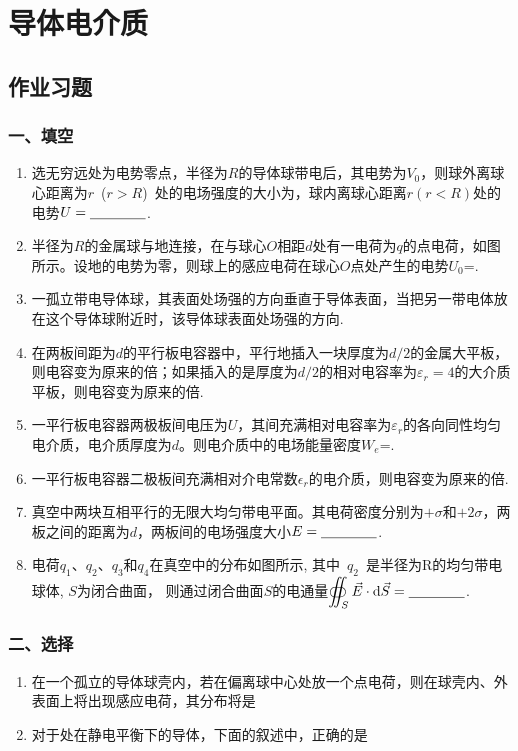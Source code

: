\chapter{导体电介质}
\section{作业习题}
\subsection*{一、填空}
\begin{enumerate}
    \item 选无穷远处为电势零点，半径为$R$的导体球带电后，其电势为$V_0$，则球外离球心距离为$r$~($r>R$)~处的电场强度的大小为\nl，球内离球心距离$r(r<R)$处的电势$U=\nl$.
    \item 半径为$R$的金属球与地连接，在与球心$O$相距$d$处有一电荷为$q$的点电荷，如图所示。设地的电势为零，则球上的感应电荷在球心$O$点处产生的电势$U_0$=\nl.    
    \item 一孤立带电导体球，其表面处场强的方向垂直于导体表面，当把另一带电体放在这个导体球附近时，该导体球表面处场强的方向\nl.
    \item 在两板间距为$d$的平行板电容器中，平行地插入一块厚度为$d/2$的金属大平板，则电容变为原来的\nl 倍；如果插入的是厚度为$d/2$的相对电容率为$\varepsilon_r = 4$的大介质平板，则电容变为原来的\nl 倍.
    \item 一平行板电容器两极板间电压为$U$，其间充满相对电容率为$\varepsilon_r$的各向同性均匀电介质，电介质厚度为$d$。则电介质中的电场能量密度$W_e$=\nl.
    \item 一平行板电容器二极板间充满相对介电常数$\epsilon_r$的电介质，则电容变为原来的\underline{\makebox[3em]{}}倍.
    \item 真空中两块互相平行的无限大均匀带电平面。其电荷密度分别为$+\sigma$和$+2\sigma$，两板之间的距离为$d$，两板间的电场强度大小$E=\nl$.
    \item 电荷$q_1$、$q_2$、$q_3$和$q_4$在真空中的分布如图所示, 
    其中~$q_2$~是半径为R的均匀带电球体, $S$为闭合曲面，
    则通过闭合曲面$S$的电通量$\displaystyle{\oiint_S {\vec{E}\cdot \mathrm{d}\vec{S}}=\nl}$.
    
\end{enumerate}
\subsection*{二、选择}
\begin{enumerate}
    \item  在一个孤立的导体球壳内，若在偏离球中心处放一个点电荷，则在球壳内、外表面上将出现感应电荷，其分布将是~\space
    \item 对于处在静电平衡下的导体，下面的叙述中，正确的是~\space
\end{enumerate}